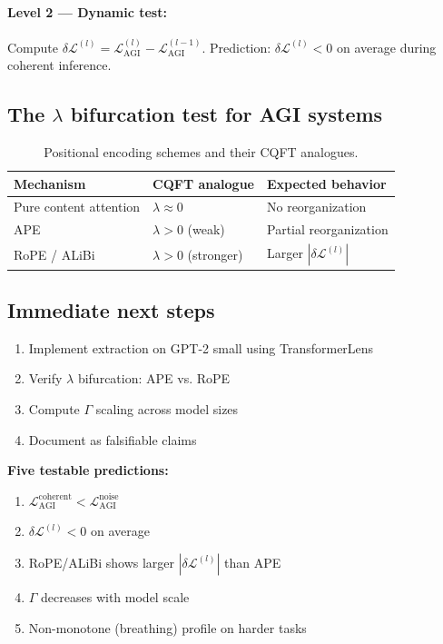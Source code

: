 \documentclass[12pt,a4paper]{article}
\theoremstyle{plain}
\theoremstyle{definition}
\begin{document}
\paragraph{Level 2 --- Dynamic test:}
Compute $\delta\mathcal{L}^{(l)} = \mathcal{L}_{\text{AGI}}^{(l)} - \mathcal{L}_{\text{AGI}}^{(l-1)}$.
Prediction: $\delta\mathcal{L}^{(l)} < 0$ on average during coherent inference.

\subsection{The $\lambda$ bifurcation test for AGI systems}

\begin{table}[H]
\centering
\caption{Positional encoding schemes and their CQFT analogues.}
\label{tab:pos_enc}
\begin{tabular}{p{4.2cm} p{3cm} p{5.5cm}}
\toprule
\textbf{Mechanism} & \textbf{CQFT analogue} & \textbf{Expected behavior} \\
\midrule
Pure content attention & $\lambda \approx 0$ & No reorganization \\
APE & $\lambda > 0$ (weak) & Partial reorganization \\
RoPE / ALiBi & $\lambda > 0$ (stronger) & Larger $|\delta\mathcal{L}^{(l)}|$ \\
\bottomrule
\end{tabular}
\end{table}

\subsection{Immediate next steps}

\begin{enumerate}[label=\textbf{Step \arabic*.}, leftmargin=*, itemsep=4pt]
  \item Implement extraction on GPT-2 small using TransformerLens
  \item Verify $\lambda$ bifurcation: APE vs. RoPE
  \item Compute $\Gamma$ scaling across model sizes
  \item Document as falsifiable claims
\end{enumerate}

\begin{keyresult}
\textbf{Five testable predictions:}
\begin{enumerate}[label=(\roman*)]
  \item $\mathcal{L}_{\text{AGI}}^{\text{coherent}} < \mathcal{L}_{\text{AGI}}^{\text{noise}}$
  \item $\delta\mathcal{L}^{(l)} < 0$ on average
  \item RoPE/ALiBi shows larger $|\delta\mathcal{L}^{(l)}|$ than APE
  \item $\Gamma$ decreases with model scale
  \item Non-monotone (breathing) profile on harder tasks
\end{enumerate}
\end{keyresult}
\end{document}
